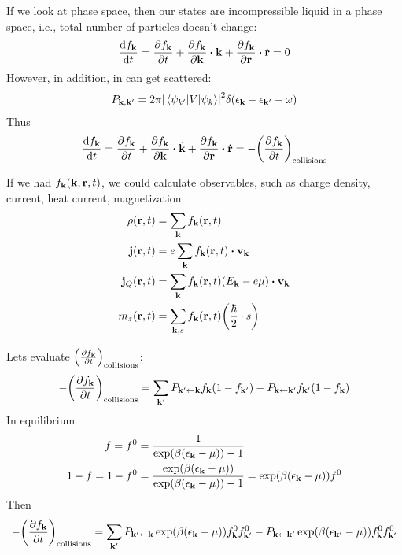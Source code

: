 If we look at phase space, then our states are incompressible liquid in a phase space, i.e., total number of particles doesn't change:
\begin{align}
\dv{f_{\vb{k}}}{t}  = \pdv{f_{\vb{k}}}{t} + \pdv{f_{\vb{k}}}{\vb{k}} \vdot \dot{\vb{k}} + \pdv{f_{\vb{k}}}{\vb{r}} \vdot \dot{\vb{r}} = 0
\end{align}
However, in addition, in can get scattered:
\begin{align}
P_{\vb{k}, \vb{k}'} = 2\pi \abs{\mel{\psi_{k'}}{V}{\psi_{k}}}^2 \delta(\epsilon_{\vb{k}} - \epsilon_{\vb{k}'}-\omega)
\end{align}
Thus
\begin{align}
\dv{f_{\vb{k}}}{t}  = \pdv{f_{\vb{k}}}{t} + \pdv{f_{\vb{k}}}{\vb{k}} \vdot \dot{\vb{k}} + \pdv{f_{\vb{k}}}{\vb{r}} \vdot \dot{\vb{r}}  = -\qty(\pdv{f_{\vb{k}}}{t})_{\text{collisions}}
\end{align}

If we had $f_{\vb{k}} \qty(\vb{k}, \vb{r}, t)$, we could calculate observables, such as charge density, current, heat current, magnetization:
\begin{align}
\rho(\vb{r}, t) &= \sum_{\vb{k}} f_{\vb{k}} (\vb{r},t)\\
\vb{j}(\vb{r}, t) &= e\sum_{\vb{k}} f_{\vb{k}} (\vb{r},t) \vdot \vb{v}_{\vb{k}}\\
\vb{j}_Q(\vb{r}, t) &= \sum_{\vb{k}} f_{\vb{k}} (\vb{r},t)(E_{\vb{k}} - e\mu) \vdot \vb{v}_{\vb{k}}\\
m_z(\vb{r}, t) &= \sum_{\vb{k},s} f_{\vb{k}} (\vb{r},t) \qty(\frac{\hbar}{2} \cdot s)\\
\end{align}

Lets evaluate $\qty(\pdv{f_{\vb{k}}}{t})_{\text{collisions}}$:
\begin{align}
-\qty(\pdv{f_{\vb{k}}}{t})_{\text{collisions}} = \sum_{\vb{k'}} P_{\vb{k}' \leftarrow \vb{k}} f_{\vb{k}} (1- f_{\vb{k}'}) - P_{\vb{k} \leftarrow \vb{k}'} f_{\vb{k}'} (1- f_{\vb{k}}) 
\end{align}
In equilibrium
\begin{align}
f=f^0 &= \frac{1}{\exp(\beta(\epsilon_{\vb{k}} - \mu)) -1 }\\
1-f=1-f^0 &= \frac{\exp(\beta(\epsilon_{\vb{k}} - \mu))}{\exp(\beta(\epsilon_{\vb{k}} - \mu)) -1 }= \exp(\beta(\epsilon_{\vb{k}} - \mu)) f^0\\
\end{align}
Then\begin{align}
-\qty(\pdv{f_{\vb{k}}}{t})_{\text{collisions}} = \sum_{\vb{k'}} P_{\vb{k}'\leftarrow \vb{k}} \exp(\beta(\epsilon_{\vb{k}} - \mu)) f^0_{\vb{k}}f^0_{\vb{k}'} - P_{\vb{k} \leftarrow \vb{k}'} \exp(\beta(\epsilon_{\vb{k}'} - \mu)) f^0_{\vb{k}}f^0_{\vb{k}'} 
\end{align}

